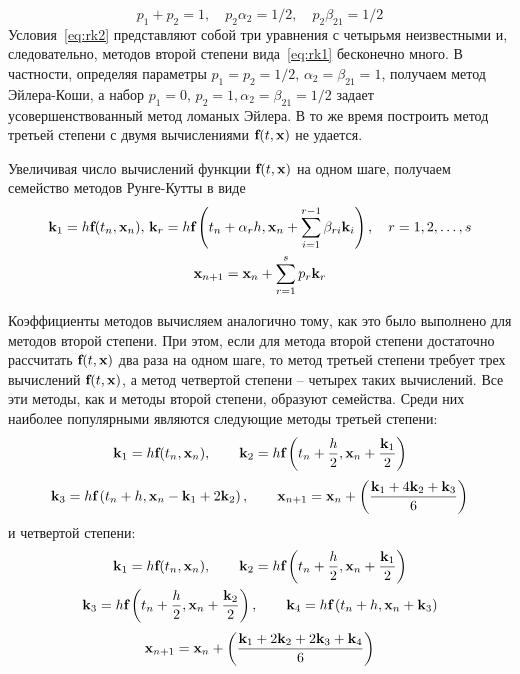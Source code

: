 \documentclass[../../calc-math-exam-2023.tex]{subfiles}
\begin{document}
    \begin{equation}
        p_1 + p_2 = 1, \quad p_2 \alpha_2 = 1/2, \quad p_2 \beta_{21} = 1/2 \label{eq:rk2}
    \end{equation}
    Условия~\eqref{eq:rk2} представляют собой три уравнения с четырьмя неизвестными и, следовательно, методов второй
    степени вида~\eqref{eq:rk1} бесконечно много. В частности, определяя параметры $p_1 = p_2 = 1/2, \, \alpha_2 = \beta_{21} = 1$,
    получаем метод Эйлера-Коши, а набор $p_1 = 0, \, p_2 = 1, \alpha_2 = \beta_{21} = 1/2$ задает усовершенствованный
    метод ломаных Эйлера. В то же время построить метод третьей степени с двумя вычислениями $\bf{f}(t, \bf{x})$ не удается.

    Увеличивая число вычислений функции $\bf{f}(t, \bf{x})$ на одном шаге, получаем семейство методов Рунге-Кутты в виде
    \begin{gather*}
        \bf{k}_1 = h\bf{f}(t_n, \bf{x}_n), \, \bf{k}_r = h\bf{f}\left( t_n + \alpha_r h, \bf{x}_n + \sum_{i=1}^{r-1} \beta_{ri}\bf{k}_i \right), \quad r=1,2,\ldots,s\\
        \bf{x}_{n+1} = \bf{x}_n + \sum_{r=1}^{s} p_r \bf{k}_r
    \end{gather*}

    Коэффициенты методов вычисляем аналогично тому, как это было выполнено для методов второй степени. При этом, если для
    метода второй степени достаточно рассчитать $\bf{f}(t, \bf{x})$ два раза на одном шаге, то метод третьей степени
    требует трех вычислений $\bf{f}(t, \bf{x})$, а метод четвертой степени -- четырех таких вычислений. Все эти методы,
    как и методы второй степени, образуют семейства. Среди них наиболее популярными являются следующие методы третьей степени:
    \begin{equation*}
        \bf{k}_1 = h\bf{f}(t_n, \bf{x}_n), \qquad \bf{k}_2 = h\bf{f}\left( t_n + \frac{h}{2}, \bf{x}_n + \frac{\bf{k}_1}{2} \right)
    \end{equation*}
    \begin{equation}
        \bf{k}_3 = h\bf{f}\left( t_n + h, \bf{x}_n - \bf{k}_1 + 2\bf{k}_2 \right), \qquad \bf{x}_{n+1} = \bf{x}_n + \left( \frac{\bf{k}_1 + 4\bf{k}_2 + \bf{k}_3}{6} \right)
    \end{equation}
    и четвертой степени:
    \begin{gather*}
        \bf{k}_1 = h\bf{f}(t_n, \bf{x}_n), \qquad \bf{k}_2 = h\bf{f}\left( t_n + \frac{h}{2}, \bf{x}_n + \frac{\bf{k}_1}{2}\right) \\
        \bf{k}_3 = h\bf{f}\left( t_n + \frac{h}{2}, \bf{x}_n + \frac{\bf{k}_2}{2} \right), \qquad \bf{k}_4 = h\bf{f}\left( t_n + h, \bf{x}_n + \bf{k}_3 \right)
    \end{gather*}
    \begin{equation}
        \bf{x}_{n+1} = \bf{x}_n + \left( \frac{\bf{k}_1 + 2\bf{k}_2 + 2\bf{k}_3 + \bf{k}_4}{6} \right)
    \end{equation}
\end{document}
